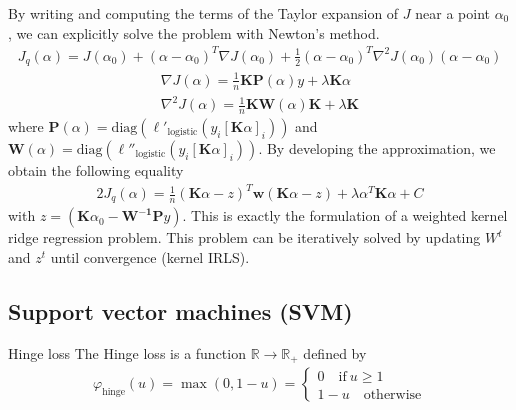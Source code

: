 \documentclass[10pt]{article}
\begin{document}
By writing and computing the terms of the Taylor expansion of $J$ near a point 
$\alpha_0$, we can explicitly solve the problem with Newton's method. 
\begin{align*}
  J_q(\alpha) = J(\alpha_0) + (\alpha - \alpha_0)^T \nabla J(\alpha_0) + 
  \frac{1}{2} (\alpha - \alpha_0)^T \nabla^2J(\alpha_0)(\alpha - \alpha_0)
\end{align*}
\begin{align*}
  \nabla J(\alpha) = \frac{1}{n}\mathbf{KP}(\alpha)y+ \lambda\mathbf{K}\alpha\\
  \nabla^2 J(\alpha) =  \frac{1}{n}\mathbf{KW}(\alpha)\mathbf{K} + \lambda 
  \mathbf{K}
\end{align*}
where $\mathbf{P}(\alpha) = \text{diag}(\ell'_{\text{logistic}}(y_i 
[\mathbf{K}\alpha]_i))$ and $\mathbf{W}(\alpha) = \text{diag}(
\ell''_{\text{logistic}}(y_i [\mathbf{K}\alpha]_i))$. By developing the 
approximation, we obtain the following equality
\begin{align*}
  2J_q(\alpha) = \frac{1}{n}(\mathbf{K}\alpha - z)^T \mathbf{w}
  (\mathbf{K}\alpha - z) + \lambda \alpha^T \mathbf{K}\alpha + C
\end{align*}
with $z = (\mathbf{K}\alpha_0 - \mathbf{W^{-1}}\mathbf{P}y)$. This is exactly 
the formulation of a weighted kernel ridge regression problem. This problem can
be iteratively solved by updating $W^t$ and $z^t$ until convergence (kernel
IRLS).

\subsection{Support vector machines (SVM)}

\begin{Definition}{Hinge loss}{}
  The Hinge loss is a function $\mathbb{R} \rightarrow \mathbb{R}_+$ defined by 
  \begin{align*}
    \varphi_\text{hinge}(u) = \max(0, 1-u) = \begin{cases}
      0\quad \text{if}\ u \geq 1\\
      1-u \quad \text{otherwise}
    \end{cases}
  \end{align*} 
\end{Definition}
\end{document}
